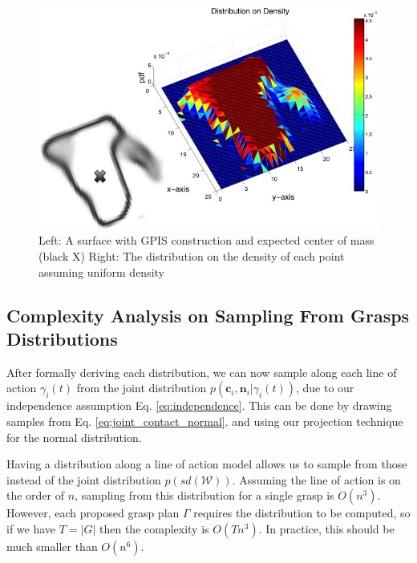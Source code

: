 \documentclass[letterpaper, 10 pt, conference]{ieeeconf}  %
\begin{document}
\begin{figure}[ht!]
\centering
\includegraphics[scale = 0.3]{figures/Slide06.jpg}
\caption{ \footnotesize Left: A surface with GPIS construction and expected center of mass (black X)
Right: The distribution on the density of each point assuming uniform density}
\vspace*{-10pt}
\label{fig:GPIS_MASS}
\end{figure}

\subsection{Complexity Analysis on Sampling From Grasps Distributions}

After formally deriving each distribution,  we can now sample along each line of action $\gamma_i(t)$ from the joint distribution $p(\textbf{c}_i,\textbf{n}_i | \gamma_i(t))$, due to our independence assumption Eq. \ref{eq:independence}. This can be done by drawing samples from Eq. \ref{eq:joint_contact_normal}. and using our projection technique for the normal distribution. 

Having a distribution along a line of action model allows us to sample from those instead of the joint distribution $p(sd(\mathcal{W}))$. Assuming the line of action is on the order of $n$, sampling from this distribution for a single grasp is $O(n^3)$. However, each proposed grasp plan $\Gamma$ requires the distribution to be computed, so if we have $T=|G|$ then the complexity is $O(Tn^3)$. In practice, this should be much smaller than $O(n^6)$. 
\end{document}
